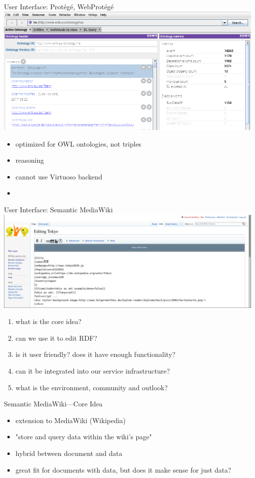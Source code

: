 \documentclass[aspectratio=1610]{beamer}
\begin{document}
\begin{frame}{User Interface: Prot\'eg\'e, WebProt\'eg\'e}
\centering
\includegraphics[width=0.6\paperwidth]{img/protege.png}
\begin{itemize}
\item optimized for OWL ontologies, not triples
\item reasoning
\item cannot use Virtuoso backend
\item 
\end{itemize}
\end{frame}

\begin{frame}{User Interface: Semantic MediaWiki}
\centering
\includegraphics[width=0.6\paperwidth]{img/smw-tokyo.png}
\begin{enumerate}
\item what is the core idea?
\item can we use it to edit RDF?
\item is it user friendly? does it have enough functionality?
\item can it be integrated into our service infrastructure?
\item what is the environment, community and outlook?
\end{enumerate}
\end{frame}

\begin{frame}{Semantic MediaWiki---Core Idea}
\begin{itemize}
\item extension to MediaWiki (Wikipedia)
\item "store and query data within the wiki's page" 
\item hybrid between document and data
\item great fit for documents with data, but does it make sense for just data?
\end{itemize}
\end{frame}
\end{document}
